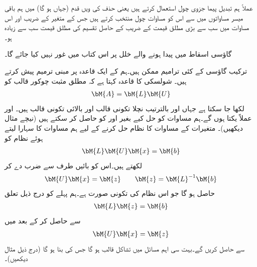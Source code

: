 عملاً ہم تبدیل پیما جزوی چول استعمال کرتے ہیں یعنی حذف کی  ویں قدم (جہاں  ہو گا) میں ہم باقی میسر  مساواتوں میں سے اس کو مساوات چول منتخب کرتے ہیں جس کے متغیر  کے  ضریب  اور اس مساوات میں سب سے بڑی مطلق قیمت کے  ضریب  کے حاصل تقسیم کی مطلق قیمت سب سے زیادہ ہو۔

گاؤسی اسقاط میں پیدا ہونے والے خلل پر اس کتاب میں غور نہیں کیا جائے گا۔   

ترکیب گاؤسی کے کئی ترامیم ممکن ہیں۔ہم  کے ایک قاعدہ پر مبنی ترمیم پیش کرتے ہیں۔ شولسکی کا قاعدہ کہتا ہے  کہ مطلق مثبت چوکور قالب  کو 
\begin{align}\label{مساوات_خطی_اعدادی_شولسکی_الف}
\bM{A}=\bM{L}\bM{U}
\end{align} 
لکھا جا سکتا ہے جہاں  اور  بالترتیب نچلا تکونی قالب اور بالائی تکونی قالب ہیں۔ اور  عملاً یکتا ہوں گے۔ہم مساوات کو حل کیے بغیر  اور  کو حاصل کر سکتے ہیں (نیچے مثال دیکھیں)۔ متغیرات کے  مساوات کا نظام  حل کرنے  کے لیے ہم  مساوات  کا سہارا لیتے ہوئے  نظام کو
\begin{align*}
\bM{L}\bM{U}\bM{x}=\bM{b}
\end{align*}
لکھتے ہیں۔اس کو بائیں طرف  سے ضرب دے کر
\begin{align}\label{مساوات_خطی_اعدادی_شولسکی_ب}
\bM{U}\bM{x}=\bM{z}\quad \quad \bM{z}=\bM{L}^{-1}\bM{b}
\end{align}
حاصل ہو گا جو اس نظام کی تکونی صورت ہے۔ہم پہلے   کو درج ذیل تعلق
\begin{align}\label{مساوات_خطی_اعدادی_شولسکی_پ}
\bM{L}\bM{z}=\bM{b}
\end{align}
سے حاصل کر کے بعد میں 
\begin{align}\label{مساوات_خطی_اعدادی_شولسکی_ت}
\bM{U}\bM{x}=\bM{z}
\end{align}
سے  حاصل کریں گے۔بہت سی اہم مسائل میں  تشاکل قالب ہو گا جس کی بنا  ہو گا (درج ذیل مثال دیکھیں)۔

